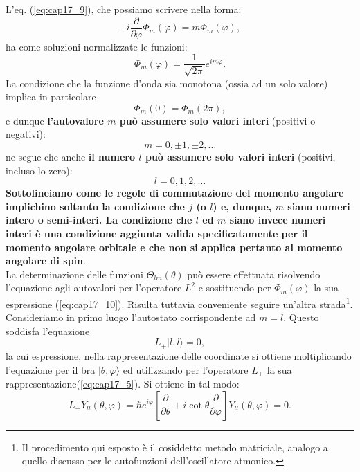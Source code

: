 \documentclass[a4paper,12pt,oneside]{book}
\begin{document}
L'eq. (\ref{eq:cap17_9}), che possiamo scrivere nella forma:
\begin{equation}
-i\frac{\partial}{\partial \varphi}\Phi _m (\varphi )= m \Phi _m (\varphi ) ,
\end{equation}
ha come soluzioni normalizzate le funzioni:
\begin{equation}
\Phi _m (\varphi ) = \frac{1}{\sqrt{2\pi}}e^{im\varphi} .
\end{equation}
La condizione che la funzione d'onda sia monotona (ossia ad un solo valore) implica in particolare
\begin{equation}
\Phi _m (0) =\Phi _m (2\pi ) ,
\label{eq:cap17_10}
\end{equation}
e dunque \textbf{l'autovalore $m$ può assumere solo valori interi} (positivi o negativi):
\begin{equation}
m= 0, \pm 1,\pm 2, \dots
\end{equation}
ne segue che anche \textbf{il numero $l$ può assumere solo valori interi} (positivi, incluso lo zero):
\begin{equation}
l= 0,1,2,\dots
\end{equation}
\textbf{Sottolineiamo come le regole di commutazione del momento angolare implichino soltanto la condizione che $j$ (o $l$) e, dunque, $m$  siano numeri intero o semi-interi. La condizione che $l$ ed $m$ siano invece numeri interi è una condizione aggiunta valida specificatamente per il momento angolare orbitale e che non si applica pertanto al momento angolare di spin}.\\
La determinazione delle funzioni $\Theta _{lm} (\theta)$ può essere effettuata risolvendo l'equazione agli autovalori per l'operatore $L^2$ e sostituendo per $\Phi _m (\varphi)$ la sua espressione (\ref{eq:cap17_10}). Risulta tuttavia conveniente seguire un'altra strada\footnote{Il procedimento qui esposto è il cosiddetto metodo matriciale, analogo a quello discusso per le autofunzioni dell'oscillatore atmonico.}. Consideriamo in primo luogo l'autostato corrispondente ad $m=l$. Questo soddisfa l'equazione
\begin{equation}
L_+ \vert l,l\rangle =0,
\end{equation}
la cui espressione, nella rappresentazione delle coordinate si ottiene moltiplicando l'equazione per il bra $\vert \theta, \varphi \rangle$ ed utilizzando per  l'operatore $L_+$ la sua rappresentazione(\ref{eq:cap17_5}). Si ottiene in tal modo:
\begin{equation}
L_+Y_{ll}(\theta , \varphi ) = \hbar e^{i\varphi}\left[\frac{\partial}{\partial\theta}+i \cot\theta \frac{\partial}{\partial \varphi}\right]Y_{ll}(\theta , \varphi ) =0 .
\end{equation}
\end{document}
